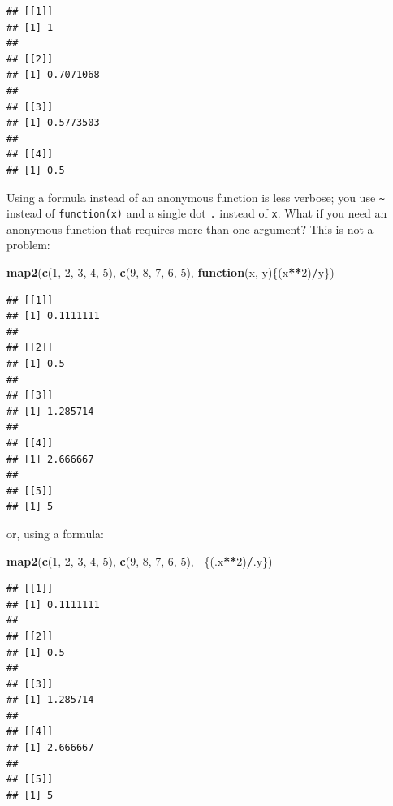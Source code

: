 \documentclass[]{gitbook}
\newenvironment{Shaded}{\begin{snugshade}}{\end{snugshade}}
\newcommand{\ControlFlowTok}[1]{\textcolor[rgb]{0.13,0.29,0.53}{\textbf{#1}}}
\newcommand{\DecValTok}[1]{\textcolor[rgb]{0.00,0.00,0.81}{#1}}
\newcommand{\KeywordTok}[1]{\textcolor[rgb]{0.13,0.29,0.53}{\textbf{#1}}}
\newcommand{\NormalTok}[1]{#1}
\newcommand{\OperatorTok}[1]{\textcolor[rgb]{0.81,0.36,0.00}{\textbf{#1}}}
\theoremstyle{definition}
\theoremstyle{definition}
\theoremstyle{definition}
\theoremstyle{remark}
\begin{document}
\begin{verbatim}
## [[1]]
## [1] 1
## 
## [[2]]
## [1] 0.7071068
## 
## [[3]]
## [1] 0.5773503
## 
## [[4]]
## [1] 0.5
\end{verbatim}

Using a formula instead of an anonymous function is less verbose; you
use \texttt{\textasciitilde{}} instead of \texttt{function(x)} and a
single dot \texttt{.} instead of \texttt{x}. What if you need an
anonymous function that requires more than one argument? This is not a
problem:

\begin{Shaded}
\begin{Highlighting}[]
\KeywordTok{map2}\NormalTok{(}\KeywordTok{c}\NormalTok{(}\DecValTok{1}\NormalTok{, }\DecValTok{2}\NormalTok{, }\DecValTok{3}\NormalTok{, }\DecValTok{4}\NormalTok{, }\DecValTok{5}\NormalTok{), }\KeywordTok{c}\NormalTok{(}\DecValTok{9}\NormalTok{, }\DecValTok{8}\NormalTok{, }\DecValTok{7}\NormalTok{, }\DecValTok{6}\NormalTok{, }\DecValTok{5}\NormalTok{), }\ControlFlowTok{function}\NormalTok{(x, y)\{(x}\OperatorTok{**}\DecValTok{2}\NormalTok{)}\OperatorTok{/}\NormalTok{y\})}
\end{Highlighting}
\end{Shaded}

\begin{verbatim}
## [[1]]
## [1] 0.1111111
## 
## [[2]]
## [1] 0.5
## 
## [[3]]
## [1] 1.285714
## 
## [[4]]
## [1] 2.666667
## 
## [[5]]
## [1] 5
\end{verbatim}

or, using a formula:

\begin{Shaded}
\begin{Highlighting}[]
\KeywordTok{map2}\NormalTok{(}\KeywordTok{c}\NormalTok{(}\DecValTok{1}\NormalTok{, }\DecValTok{2}\NormalTok{, }\DecValTok{3}\NormalTok{, }\DecValTok{4}\NormalTok{, }\DecValTok{5}\NormalTok{), }\KeywordTok{c}\NormalTok{(}\DecValTok{9}\NormalTok{, }\DecValTok{8}\NormalTok{, }\DecValTok{7}\NormalTok{, }\DecValTok{6}\NormalTok{, }\DecValTok{5}\NormalTok{), }\OperatorTok{~}\NormalTok{\{(.x}\OperatorTok{**}\DecValTok{2}\NormalTok{)}\OperatorTok{/}\NormalTok{.y\})}
\end{Highlighting}
\end{Shaded}

\begin{verbatim}
## [[1]]
## [1] 0.1111111
## 
## [[2]]
## [1] 0.5
## 
## [[3]]
## [1] 1.285714
## 
## [[4]]
## [1] 2.666667
## 
## [[5]]
## [1] 5
\end{verbatim}
\end{document}
